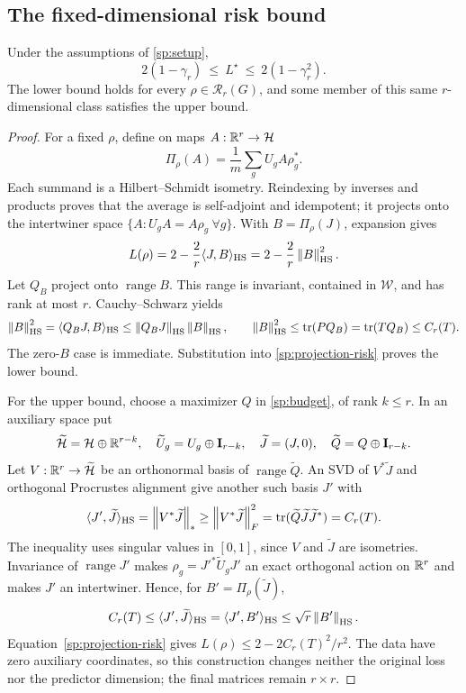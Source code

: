 \subsection{The fixed-dimensional risk bound}
\begin{spectraltheorem}
\label{sp:main}
Under the assumptions of \cref{sp:setup},
\begin{equation}
 \boxed{\quad 2(1-\gamma_r)\ \le\ L^\star\ \le\ 2(1-\gamma_r^2).\quad}
 \label{sp:sandwich}
\end{equation}
The lower bound holds for every $\rho\in\mathcal R_r(G)$, and some member of this same $r$-dimensional class satisfies the upper bound.
\end{spectraltheorem}
\begin{proof}
For a fixed $\rho$, define on maps $A:\mathbb{R}^r\to\mathcal H$
\[
 \Pi_\rho(A)=\frac1m\sum_gU_gA\rho_g^*.
\]
Each summand is a Hilbert--Schmidt isometry. Reindexing by inverses and products proves that the average is self-adjoint and idempotent; it projects onto the intertwiner space $\{A:U_gA=A\rho_g\ \forall g\}$. With $B=\Pi_\rho(J)$, expansion gives
\begin{equation}
 L(\rho)=2-\frac2r\langle J,B\rangle_{\mathrm{HS}}
        =2-\frac2r\left\lVert B\right\rVert_{\mathrm{HS}}^2.
 \label{sp:projection-risk}
\end{equation}
Let $Q_B$ project onto $\operatorname{range}B$. This range is invariant, contained in $\mathcal W$, and has rank at most $r$. Cauchy--Schwarz yields
\[
 \left\lVert B\right\rVert_{\mathrm{HS}}^2=\langle Q_BJ,B\rangle_{\mathrm{HS}}
 \le\left\lVert Q_BJ\right\rVert_{\mathrm{HS}}\left\lVert B\right\rVert_{\mathrm{HS}},\qquad
 \left\lVert B\right\rVert_{\mathrm{HS}}^2\le\operatorname{tr}(PQ_B)
 =\operatorname{tr}(TQ_B)\le C_r(T).
\]
The zero-$B$ case is immediate. Substitution into \cref{sp:projection-risk} proves the lower bound.

For the upper bound, choose a maximizer $Q$ in \cref{sp:budget}, of rank $k\le r$. In an auxiliary space put
\[
 \widetilde{\mathcal H}=\mathcal H\oplus\mathbb{R}^{r-k},\quad
 \widetilde U_g=U_g\oplus\mathbf{I}_{r-k},\quad
 \widetilde J=(J,0),\quad \widetilde Q=Q\oplus\mathbf{I}_{r-k}.
\]
Let $V:\mathbb{R}^r\to\widetilde{\mathcal H}$ be an orthonormal basis of $\operatorname{range}\widetilde Q$. An SVD of $V^*\widetilde J$ and orthogonal Procrustes alignment give another such basis $J'$ with
\[
 \langle J',\widetilde J\rangle_{\mathrm{HS}}
 =\left\lVert V^*\widetilde J\right\rVert_*
 \ge\left\lVert V^*\widetilde J\right\rVert_F^2
 =\operatorname{tr}(\widetilde Q\widetilde J\widetilde J^*)=C_r(T).
\]
The inequality uses singular values in $[0,1]$, since $V$ and $\widetilde J$ are isometries. Invariance of $\operatorname{range}J'$ makes $\rho_g=J'^*\widetilde U_gJ'$ an exact orthogonal action on $\mathbb{R}^r$ and makes $J'$ an intertwiner. Hence, for $B'=\Pi_\rho(\widetilde J)$,
\[
 C_r(T)\le\langle J',\widetilde J\rangle_{\mathrm{HS}}
 =\langle J',B'\rangle_{\mathrm{HS}}
 \le\sqrt r\left\lVert B'\right\rVert_{\mathrm{HS}}.
\]
Equation~\eqref{sp:projection-risk} gives $L(\rho)\le2-2C_r(T)^2/r^2$. The data have zero auxiliary coordinates, so this construction changes neither the original loss nor the predictor dimension; the final matrices remain $r\times r$.
\end{proof}

